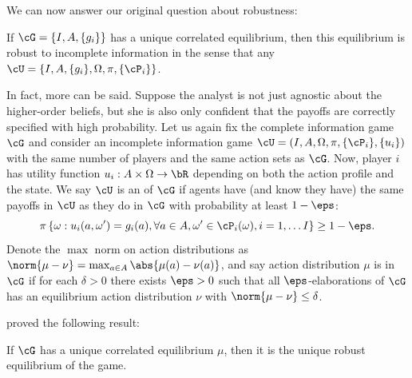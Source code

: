 We can now answer our original question about robustness:
\begin{corollary}
  If \(\cG = \{I, A, \{g_i\}\}\) has a unique correlated equilibrium, then this equilibrium is robust to incomplete information in the sense that any \(\cU = \{I, A, \{g_i\}, \Omega, \pi, \{\cP_i\}\}\).
\end{corollary}

In fact, more can be said.
Suppose the analyst is not just agnostic about the higher-order beliefs, but she is also only confident that the payoffs are correctly specified with high probability.
Let us again fix the complete information game \(\cG\) and consider an incomplete information game \(\cU = (I, A, \Omega, \pi, \{\cP_i\}, \{u_i\})\) with the same number of players and the same action sets as \(\cG\).
Now, player \(i\) has utility function \(u_i: A \times \Omega \to \bR\) depending on both the action profile and the state.
We say \(\cU\) is an  of \(\cG\) if agents have (and know they have) the same payoffs in \(\cU\) as they do in \(\cG\) with probability at least \(1 - \eps\):
\[
  \pi\left\{ \omega: u_i(a, \omega') = g_i(a), \forall a \in A, \omega' \in \cP_i(\omega), i = 1, \dots I \right\}
  \geq 1 - \eps.
\]
Denote the \(\max\) norm on action distributions as \(\norm{\mu - \nu} = \max_{a \in A} \abs{\mu(a) - \nu(a)}\), and say action distribution \(\mu\) is  in \(\cG\) if for each \(\delta > 0\) there exists \(\eps > 0\) such that all \(\eps\)-elaborations of \(\cG\) has an equilibrium action distribution \(\nu\) with \(\norm{\mu - \nu} \leq \delta\).

\Textcite{kajii1997RobustnessEquilibria} proved the following result:
\begin{proposition}
  If \(\cG\) has a unique correlated equilibrium \(\mu\), then it is the unique robust equilibrium of the game.
\end{proposition}



